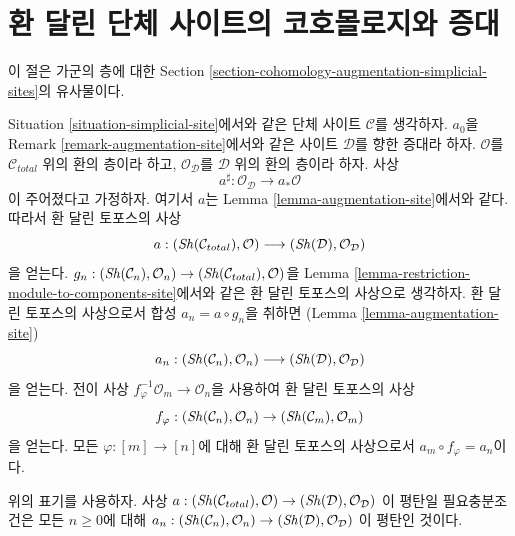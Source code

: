 \section{환 달린 단체 사이트의 코호몰로지와 증대}
\label{section-cohomology-augmentation-ringed-simplicial-sites}

\noindent
이 절은 가군의 층에 대한
Section \ref{section-cohomology-augmentation-simplicial-sites}의 유사물이다.

\medskip\noindent
Situation \ref{situation-simplicial-site}에서와 같은 단체 사이트
$\mathcal{C}$를 생각하자. $a_0$을 Remark
\ref{remark-augmentation-site}에서와 같은 사이트 $\mathcal{D}$를 향한
증대라 하자. $\mathcal{O}$를 $\mathcal{C}_{total}$ 위의 환의 층이라 하고,
$\mathcal{O}_\mathcal{D}$를 $\mathcal{D}$ 위의 환의 층이라 하자.
사상
$$
a^\sharp : \mathcal{O}_\mathcal{D} \longrightarrow a_*\mathcal{O}
$$
이 주어졌다고 가정하자. 여기서 $a$는 Lemma
\ref{lemma-augmentation-site}에서와 같다. 따라서 환 달린 토포스의 사상
$$
a :
(\mathop{\mathit{Sh}}\nolimits(\mathcal{C}_{total}), \mathcal{O})
\longrightarrow
(\mathop{\mathit{Sh}}\nolimits(\mathcal{D}), \mathcal{O}_\mathcal{D})
$$
을 얻는다. $g_n : (\mathop{\mathit{Sh}}\nolimits(\mathcal{C}_n), \mathcal{O}_n) \to
(\mathop{\mathit{Sh}}\nolimits(\mathcal{C}_{total}), \mathcal{O})$을 Lemma
\ref{lemma-restriction-module-to-components-site}에서와 같은
환 달린 토포스의 사상으로 생각하자. 환 달린 토포스의 사상으로서
합성 $a_n = a \circ g_n$을 취하면
(Lemma \ref{lemma-augmentation-site})
$$
a_n :
(\mathop{\mathit{Sh}}\nolimits(\mathcal{C}_n), \mathcal{O}_n)
\longrightarrow
(\mathop{\mathit{Sh}}\nolimits(\mathcal{D}), \mathcal{O}_\mathcal{D})
$$
을 얻는다. 전이 사상
$f_\varphi^{-1}\mathcal{O}_m \to \mathcal{O}_n$을 사용하여
환 달린 토포스의 사상
$$
f_\varphi : (\mathop{\mathit{Sh}}\nolimits(\mathcal{C}_n), \mathcal{O}_n) \to
(\mathop{\mathit{Sh}}\nolimits(\mathcal{C}_m), \mathcal{O}_m)
$$
을 얻는다. 모든 $\varphi : [m] \to [n]$에 대해
환 달린 토포스의 사상으로서 $a_m \circ f_\varphi = a_n$이다.

\begin{lemma}
\label{lemma-flat-augmentation-modules}
위의 표기를 사용하자. 사상\newline
$a : (\mathop{\mathit{Sh}}\nolimits(\mathcal{C}_{total}), \mathcal{O}) \to
(\mathop{\mathit{Sh}}\nolimits(\mathcal{D}), \mathcal{O}_\mathcal{D})$
이 평탄일 필요충분조건은 모든 $n \geq 0$에 대해\newline
$a_n : (\mathop{\mathit{Sh}}\nolimits(\mathcal{C}_n), \mathcal{O}_n) \to
(\mathop{\mathit{Sh}}\nolimits(\mathcal{D}), \mathcal{O}_\mathcal{D})$
이 평탄인 것이다.
\end{lemma}

